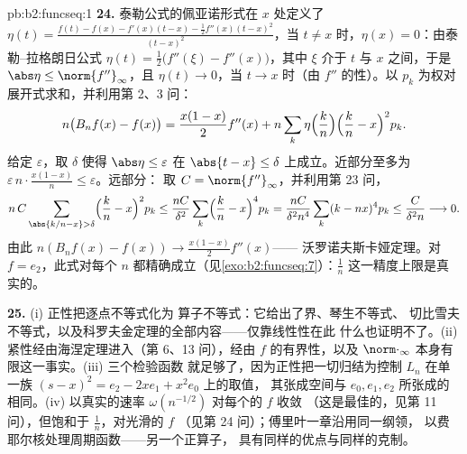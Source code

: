 \begin{solution}{pb:b2:funcseq:1}
\textbf{24.} 泰勒公式的佩亚诺形式在 $x$ 处定义了 $\eta(t) =
\frac{f(t) - f(x) - f'(x)(t-x) - \frac12f''(x)(t-x)^2}
{(t-x)^2}$，当 $t \neq x$ 时，$\eta(x) = 0$：由泰勒--拉格朗日公式
$\eta(t) = \frac12\bigl(f''(\xi) - f''(x)\bigr)$，其中 $\xi$
介于 $t$ 与 $x$ 之间，于是 $\abs\eta \leq \norm{f''}_\infty$，且
$\eta(t) \to 0$，当 $t \to x$ 时（由 $f''$ 的性）。以
$p_k$ 为权对展开式求和，并利用第 2、3 问：
\[
n\bigl(B_nf(x) - f(x)\bigr)
= \frac{x(1-x)}{2}f''(x)
+ n\sum_k\eta\Bigl(\frac kn\Bigr)\Bigl(\frac kn -
x\Bigr)^2p_k .
\]
给定 $\varepsilon$，取 $\delta$ 使得 $\abs\eta \leq
\varepsilon$ 在 $\abs{t - x}\leq\delta$ 上成立。近部分至多为
$\varepsilon\,n\cdot\frac{x(1-x)}n \leq \varepsilon$。远部分：
取 $C = \norm{f''}_\infty$，并利用第 23 问，
\[
n\,C\sum_{\abs{k/n-x}>\delta}\Bigl(\frac kn -
x\Bigr)^2p_k
\leq \frac{nC}{\delta^2}\sum_k\Bigl(\frac kn -
x\Bigr)^4p_k
= \frac{nC}{\delta^2 n^4}\sum_k(k-nx)^4p_k
\leq \frac{C}{\delta^2 n} \longrightarrow 0 .
\]
由此 $n(B_nf(x) - f(x)) \to \frac{x(1-x)}2f''(x)$——
沃罗诺夫斯卡娅定理。对 $f = e_2$，此式对每个
$n$ 都精确成立（见\cref{exo:b2:funcseq:7}）：$\frac1n$ 这一精度上限是真实的。

\textbf{25.} (i) 正性把逐点不等式化为
算子不等式：它给出了界、琴生不等式、
切比雪夫不等式，以及科罗夫金定理的全部内容——仅靠线性性在此
什么也证明不了。(ii) 紧性经由海涅定理进入（第
6、13 问），经由 $f$ 的有界性，以及
$\norm\cdot_\infty$ 本身有限这一事实。(iii) 三个检验函数
就足够了，因为正性把一切归结为控制
$L_n$ 在单一族 $(s-x)^2 = e_2 - 2xe_1 + x^2e_0$ 上的取值，
其张成空间与 $e_0, e_1, e_2$ 所张成的相同。(iv) 
以真实的速率 $\omega(n^{-1/2})$ 对每个的 $f$ 收敛
（这是最佳的，见第 11 问），但饱和于 $\frac1n$，对光滑的 $f$
（见第 24 问）；傅里叶一章沿用同一纲领，
以费耶尔核处理周期函数——另一个正算子，
具有同样的优点与同样的克制。
\end{solution}
